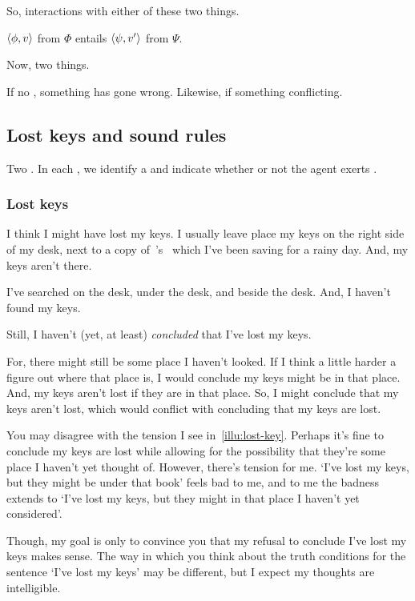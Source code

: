 \begin{note}
  So, interactions with either of these two things.
\end{note}

\begin{note}
  \(\langle \phi, v \rangle\) from \(\Phi\) entails \(\langle \psi, v' \rangle\) from \(\Psi\).

  Now, two things.

  If no \pevent{}, something has gone wrong.
  Likewise, if something conflicting.
\end{note}

\subsection{Lost keys and sound rules}
\label{cha:requs:sec:init-illustr}

\begin{note}
  Two .
  In each , we identify a \requ{} and indicate whether or not the agent exerts \ninf{}.
\end{note}

\subsubsection{Lost keys}

\begin{note}
  \begin{illustration}
    \label{illu:lost-key}
    I think I might have lost my keys.
    I usually leave place my keys on the right side of my desk, next to a copy of~\citeauthor{Vickers:1989tr}'s~ which I've been saving for a rainy day.
    And, my keys aren't there.

    I've searched on the desk, under the desk, and beside the desk.
    And, I haven't found my keys.

    Still, I haven't (yet, at least) \emph{concluded} that I've lost my keys.

    For, there might still be some place I haven't looked.
    If I think a little harder a figure out where that place is, I would conclude my keys might be in that place.
    And, my keys aren't lost if they are in that place.
    So, I might conclude that my keys aren't lost, which would conflict with concluding that my keys are lost.
  \end{illustration}

  You may disagree with the tension I see in~\autoref{illu:lost-key}.
  Perhaps it's fine to conclude my keys are lost while allowing for the possibility that they're some place I haven't yet thought of.
  However, there's tension for me.
  `I've lost my keys, but they might be under that book' feels bad to me, and to me the badness extends to `I've lost my keys, but they might in that place I haven't yet considered'.

  Though, my goal is only to convince you that my refusal to conclude I've lost my keys makes sense.
  The way in which you think about the truth conditions for the sentence `I've lost my keys' may be different, but I expect my thoughts are intelligible.
\end{note}

